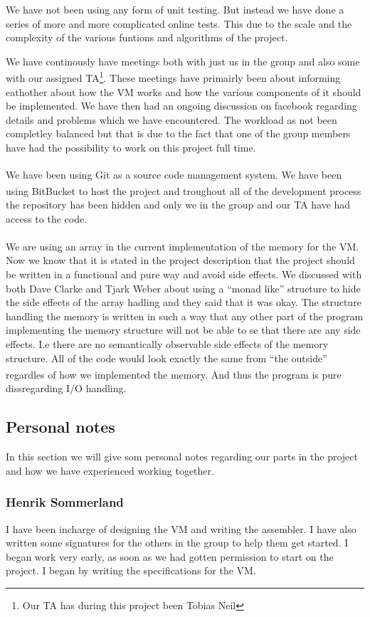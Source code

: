 \documentclass{article}
\begin{document}
We have not been using any form of unit testing. But instead we have done a
series of more and more complicated online tests. This due to the scale and the
complexity of the various funtions and algorithms of the project.

We have continously have meetings both with just us in the group and also some
with our assigned TA\footnote{Our TA has during this project been Tobias Neil}.
These meetings have primairly been about informing eathother about how the 
VM works and how the various components of it should be
implemented. We have then had an ongoing discussion on facebook regarding
details and problems which we have encountered. The workload as not been
completley balanced but that is due to the fact that one of the group members
have had the possibility to work on this project full time.

We have been using Git\textsuperscript{\cite{git}} as a source code management
system. We have been using BitBucket\textsuperscript{\cite{bitbucket}} to
host the project and troughout all of the development process the repository has 
been hidden and only we in the group and our TA have had access to the code.\\
\\
We are using an array in the current implementation of the memory for the VM.
Now we know that it is stated in the project description that the project should
be written in a functional and pure way and avoid side effects. We discussed
with both Dave Clarke and Tjark Weber about using a ``monad like'' structure 
to hide the side effects of the array hadling and they said that it was okay.
The structure handling the memory is written in such a way that any other part
of the program implementing the memory structure will not be able to se that there
are any side effects. I.e there are no semantically observable side effects of 
the memory structure. All of the code would look exactly the same from ``the
outside'' regardles of how we implemented the memory. And thus the program is
pure\textsuperscript{\cite{pure}} dissregarding I/O handling.

\subsection{Personal notes}
In this section we will give som personal notes regarding our parts in the
project and how we have experienced working together.
\subsubsection{Henrik Sommerland}
I have been incharge of designing the VM and writing the assembler. I have also
written some signatures for the others in the group to help them get started. I
began work very early, as soon as we had gotten permission to start on the
project. I  began by writing the specifications for the VM.
\end{document}
